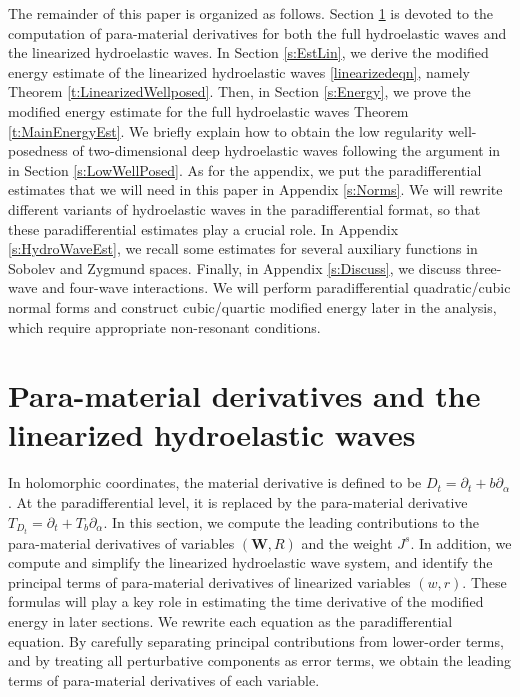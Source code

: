 \documentclass[10pt]{amsart}
\theoremstyle{remark}
\theoremstyle{definition}
\numberwithin{equation}{section}
\newcommand{\bw}{\mathbf{W}}
\begin{document}
The remainder of this paper is organized as follows.
Section \ref{s:ParaMat} is devoted to the computation of para-material derivatives for both the full hydroelastic waves and the linearized hydroelastic waves.
In Section \ref{s:EstLin}, we derive the modified energy estimate of the linearized hydroelastic waves \eqref{linearizedeqn}, namely Theorem \ref{t:LinearizedWellposed}.
Then, in Section \ref{s:Energy}, we prove the modified energy estimate for the full hydroelastic waves Theorem \ref{t:MainEnergyEst}.
We briefly explain how to obtain the low regularity well-posedness of two-dimensional deep hydroelastic waves following the argument in \cite{AIT} in Section \ref{s:LowWellPosed}.
As for the appendix, we put the paradifferential estimates that we will need in this paper in Appendix \ref{s:Norms}.
We will rewrite  different variants of hydroelastic waves in the paradifferential format, so that these paradifferential estimates play a crucial role.
In Appendix \ref{s:HydroWaveEst}, we recall some estimates for several auxiliary functions in Sobolev and Zygmund spaces.
Finally, in Appendix \ref{s:Discuss}, we discuss three-wave and four-wave interactions. 
We will perform paradifferential quadratic/cubic normal forms and construct cubic/quartic modified energy later in the analysis, which require appropriate non-resonant conditions.
   
\section{Para-material derivatives and the linearized hydroelastic waves} \label{s:ParaMat}
In holomorphic coordinates, the material derivative is defined to be $D_t = \partial_t + b \partial_\alpha$.
At the paradifferential level, it is replaced by the para-material derivative $T_{D_t} = \partial_t + T_b \partial_\alpha$. 
In this section, we compute the leading contributions to the para-material derivatives of variables $(\bw, R)$ and the weight $J^s$.  
In addition, we compute and simplify the linearized hydroelastic wave system, and identify the principal terms of para-material derivatives of linearized variables $(w, r)$. 
These formulas will play a key role in estimating the time derivative of the modified energy in later sections.
We rewrite each equation as the paradifferential equation.
By carefully separating principal contributions from lower-order terms, and by treating all perturbative components as error terms, we obtain the leading terms of para-material derivatives of each variable.
  
\end{document}
